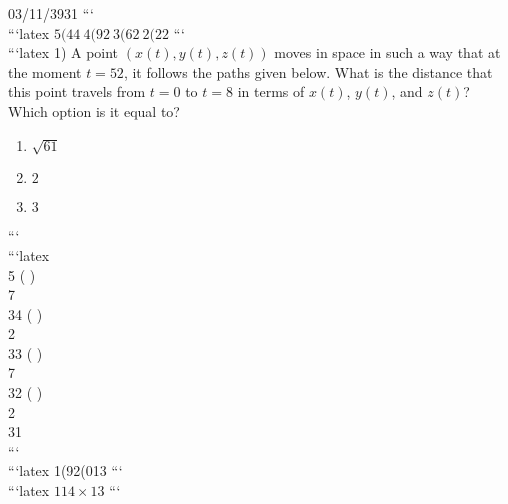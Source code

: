03/11/3931
```
\\
```latex
$5(44 \ 4(92 \ 3(62 \ 2(22$
```
\\
```latex
1) A point $(x(t), y(t), z(t))$ moves in space in such a way that at the moment $t = 52$, it follows the paths given below. What is the distance that this point travels from $t = 0$ to $t = 8$ in terms of $x(t)$, $y(t)$, and $z(t)$? Which option is it equal to? 
\begin{enumerate}
    \item $\sqrt{61}$
    \item $2$
    \item $3$
\end{enumerate}
```
\\
```latex
 \\
5 \left(  \right) \\
7 \\
34 \left(  \right) \\
2 \\
33 \left(  \right) \\
7 \\
32 \left(  \right) \\
2 \\
31 \\
```
\\
```latex
1(92(013
```
\\
```latex
$114 \times 13$
```
\\
\documentclass{article}
\usepackage{amsmath}


In a regular nonagon $K$, the points $A_1, A_2, \ldots, A_9$ are vertices. The triangles $A_6A_7M$ and $A_8A_9N$ are equilateral, and $A_1A_2A_4$ is parallel to $A_6A_7M$. What is the measure of the angle $\angle MKN$?


\\
```latex
Question:
\[ (54 ) \times (04 ) \times (03 ) \times (02) \]
```
\\
```latex
1) Let \( f: A \to \{0, 1, 2\} \) be a function and \( A \) be the set of points with integer coordinates in the plane. Assume \( x \) and \( y \) are integers such that for every \( (x, y) \), the expression 

\[ f(x, y) - f(x+1, y) - f(x-1, y) - f(x, y+1) - f(x, y-1) \]

is divisible by 3. Which statement is correct? 

